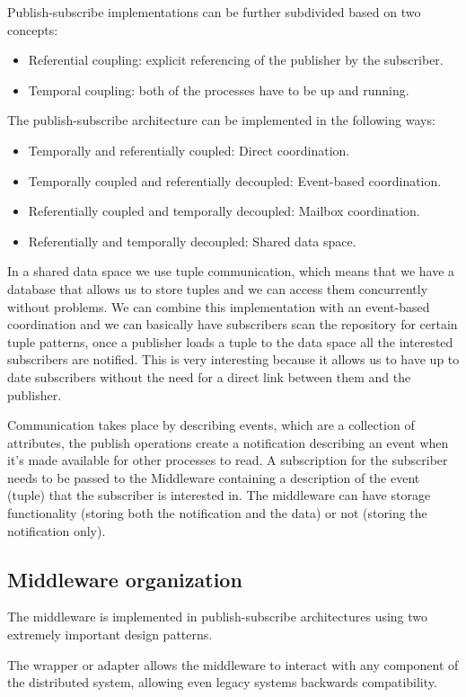Publish-subscribe implementations can be further subdivided based on two concepts:
\begin{itemize}
    \item Referential coupling: explicit referencing of the publisher by the subscriber.
    \item Temporal coupling: both of the processes have to be up and running.
\end{itemize}
The publish-subscribe architecture can be implemented in the following ways:
\begin{itemize}
    \item Temporally and referentially coupled: Direct coordination.
    \item Temporally coupled and referentially decoupled: Event-based coordination.
    \item Referentially coupled and temporally decoupled: Mailbox coordination.
    \item Referentially and temporally decoupled: Shared data space.
\end{itemize}
In a shared data space we use tuple communication, which means that we have a database that allows us to store tuples and we can access them concurrently without problems. We can combine this implementation with an event-based coordination and we can basically have subscribers scan the repository for certain tuple patterns, once a publisher loads a tuple to the data space all the interested subscribers are notified. This is very interesting because it allows us to have up to date subscribers without the need for a direct link between them and the publisher.

Communication takes place by describing events, which are a collection of attributes, the publish operations create a notification describing an event when it's made available for other processes to read. A subscription for the subscriber needs to be passed to the Middleware containing a description of the event (tuple) that the subscriber is interested in. The middleware can have storage functionality (storing both the notification and the data) or not (storing the notification only).

\subsection{Middleware organization}
The middleware is implemented in publish-subscribe architectures using two extremely important design patterns.

The wrapper or adapter allows the middleware to interact with any component of the distributed system, allowing even legacy systems backwards compatibility.

